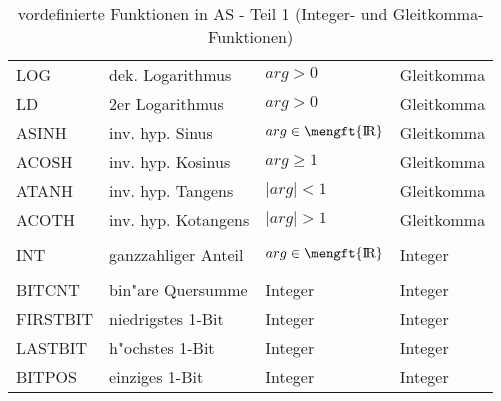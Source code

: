 \documentclass[12pt,a4paper,twoside]{report}
\def \rz{\hbox{\mengft{I \hskip -1.7mm R}}}
\begin{document}
\begin{table*}[htbp]
\begin{center}
\begin{tabular}{|l|l|l|l|}
LOG      & dek. Logarithmus     & $arg > 0$ & Gleitkomma \\
LD       & 2er Logarithmus      & $arg > 0$ & Gleitkomma \\
ASINH    & inv. hyp. Sinus      & $arg \in \rz$ & Gleitkomma \\
ACOSH    & inv. hyp. Kosinus    & $arg \geq 1$ & Gleitkomma \\
ATANH    & inv. hyp. Tangens    & $\mid arg \mid < 1$ & Gleitkomma \\
ACOTH    & inv. hyp. Kotangens  & $\mid arg \mid > 1$ & Gleitkomma \\
         &                      & & \\
INT      & ganzzahliger Anteil  & $arg \in \rz$ & Integer \\
         &                      & & \\
BITCNT   & bin"are Quersumme    & Integer      & Integer \\
FIRSTBIT & niedrigstes 1-Bit    & Integer      & Integer \\
LASTBIT  & h"ochstes 1-Bit      & Integer      & Integer \\
BITPOS   & einziges 1-Bit       & Integer      & Integer \\
\hline
\end{tabular}\end{center}
\caption{vordefinierte Funktionen in AS - Teil 1 (Integer- und
         Gleitkomma-Funktionen)\label{TabFuncs1}}
\end{table*}
\end{document}
